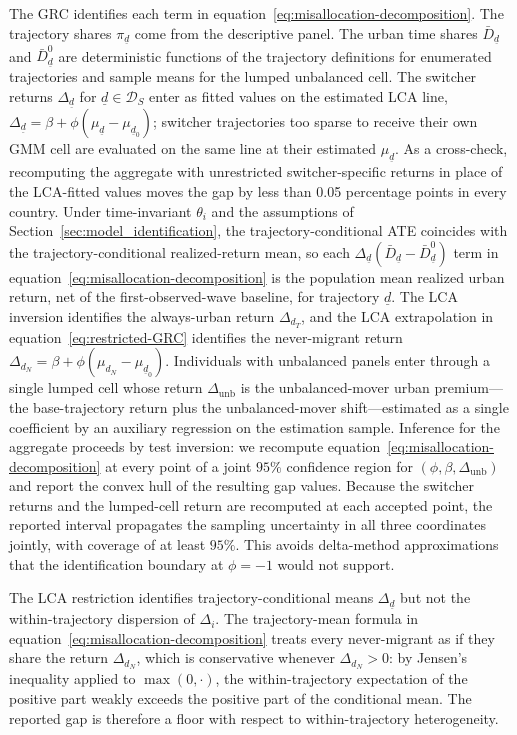 The GRC identifies each term in equation~\eqref{eq:misallocation-decomposition}.
The trajectory shares $\pi_{\underline{d}}$ come from the descriptive panel.
The urban time shares $\bar{D}_{\underline{d}}$ and $\bar{D}^0_{\underline{d}}$ are deterministic functions of the trajectory definitions for enumerated trajectories and sample means for the lumped unbalanced cell.
The switcher returns $\Delta_{\underline{d}}$ for $\underline{d} \in \mathcal{D}_S$ enter as fitted values on the estimated LCA line, $\Delta_{\underline{d}} = \beta + \phi(\mu_{\underline{d}} - \mu_{\underline{d}_0})$; switcher trajectories too sparse to receive their own GMM cell are evaluated on the same line at their estimated $\mu_{\underline{d}}$.
As a cross-check, recomputing the aggregate with unrestricted switcher-specific returns in place of the LCA-fitted values moves the gap by less than 0.05 percentage points in every country.
Under time-invariant $\theta_i$ and the assumptions of Section~\ref{sec:model_identification}, the trajectory-conditional ATE coincides with the trajectory-conditional realized-return mean, so each $\Delta_{\underline{d}} (\bar{D}_{\underline{d}} - \bar{D}^0_{\underline{d}})$ term in equation~\eqref{eq:misallocation-decomposition} is the population mean realized urban return, net of the first-observed-wave baseline, for trajectory $\underline{d}$.
The LCA inversion identifies the always-urban return $\Delta_{d_T}$, and the LCA extrapolation in equation~\eqref{eq:restricted-GRC} identifies the never-migrant return $\Delta_{d_N} = \beta + \phi(\mu_{d_N} - \mu_{\underline{d}_0})$.
Individuals with unbalanced panels enter through a single lumped cell whose return $\Delta_{\text{unb}}$ is the unbalanced-mover urban premium---the base-trajectory return plus the unbalanced-mover shift---estimated as a single coefficient by an auxiliary regression on the estimation sample.
Inference for the aggregate proceeds by test inversion: we recompute equation~\eqref{eq:misallocation-decomposition} at every point of a joint $95\%$ confidence region for $(\phi, \beta, \Delta_{\text{unb}})$ and report the convex hull of the resulting gap values.
Because the switcher returns and the lumped-cell return are recomputed at each accepted point, the reported interval propagates the sampling uncertainty in all three coordinates jointly, with coverage of at least $95\%$.
This avoids delta-method approximations that the identification boundary at $\phi = -1$ would not support.

The LCA restriction identifies trajectory-conditional means $\Delta_{\underline{d}}$ but not the within-trajectory dispersion of $\Delta_i$.
The trajectory-mean formula in equation~\eqref{eq:misallocation-decomposition} treats every never-migrant as if they share the return $\Delta_{d_N}$, which is conservative whenever $\Delta_{d_N} > 0$: by Jensen's inequality applied to $\max(0, \cdot)$, the within-trajectory expectation of the positive part weakly exceeds the positive part of the conditional mean.
The reported gap is therefore a floor with respect to within-trajectory heterogeneity.

